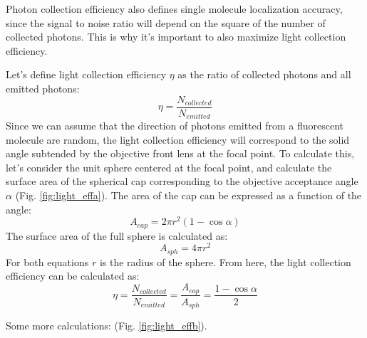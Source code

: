   Photon collection efficiency also defines single molecule localization accuracy, since the signal to noise ratio will depend on the square of the number of collected photons. This is why it's important to also maximize light collection efficiency.

  Let's define light collection efficiency $\eta$ as the ratio of collected photons and all emitted photons:
  \[
  \eta = \frac{N_{collected}}{N_{emitted}}
  \]
  Since we can assume that the direction of photons emitted from a fluorescent molecule are random, the light collection efficiency will correspond to the solid angle subtended by the objective front lens at the focal point. To calculate this, let's consider the unit sphere centered at the focal point, and calculate the surface area of the spherical cap corresponding to the objective acceptance angle $\alpha$ (Fig. \ref{fig:light_effa}). The area of the cap can be expressed as a function of the angle:
  \[
  A_{cap} = 2\pi r^2 (1-\cos \alpha)
  \]
  The surface area of the full sphere is calculated as:
  \[
  A_{sph} = 4 \pi r^2
  \]
  For both equations $r$ is the radius of the sphere. From here, the light collection efficiency can be calculated as:
  \[
  \eta = \frac{N_{collected}}{N_{emitted}} = \frac{A_{cap}}{A_{sph}} = \frac{1-\cos \alpha}{2}
  \]

  Some more calculations: (Fig. \ref{fig:light_effb}).

